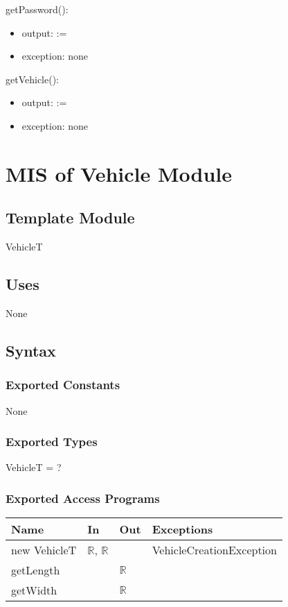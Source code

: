 \documentclass[12pt, titlepage]{article}
\begin{document}
\noindent getPassword():
\begin{itemize} 
\item output:  :=  
\item exception: none
\end{itemize}

\noindent getVehicle():
\begin{itemize} 
\item output:  :=  
\item exception: none
\end{itemize}

\newpage

\section{MIS of Vehicle Module} 
\label{vehicle:Module}

\subsection{Template Module}
VehicleT

\subsection{Uses}
None

\subsection{Syntax}

\subsubsection{Exported Constants}
None

\subsubsection{Exported Types}
VehicleT = ?

\subsubsection{Exported Access Programs}

\begin{tabular}{p{4cm} p{3cm} p{2cm} p{5cm}}
\hline
\textbf{Name} & \textbf{In} & \textbf{Out} & \textbf{Exceptions} \\
\hline
new VehicleT & $\mathbb{R}$, $\mathbb{R}$ & ~ & VehicleCreationException \\
getLength & ~ & $\mathbb{R}$ & ~ \\
getWidth & ~ & $\mathbb{R}$ & ~ \\
\hline
\end{tabular}
\end{document}
